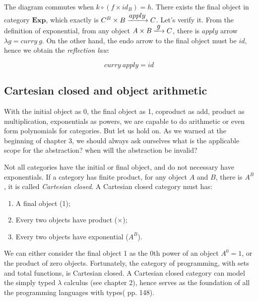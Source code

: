 \documentclass{article}
\begin{document}
The diagram commutes when $k \circ (f \times id_B) = h$. There exists the final object in category $\pmb{Exp}$, which exactly is $C^B \times B \arrowto{apply} C$. Let's verify it. From the definition of exponential, from any object $A \times B \arrowto{g} C$, there is $apply$ arrow $\lambda g = curry\ g$. On the other hand, the endo arrow to the final object must be $id$, hence we obtain the {\em reflection law}:

\[
curry\ apply = id
\]

\begin{Exercise}
\end{Exercise}

\subsection{Cartesian closed and object arithmetic}

With the initial object as 0, the final object as 1, coproduct as add, product as multiplication, exponentials as powers, we are capable to do arithmetic or even form polynomials for categories. But let us hold on. As we warned at the beginning of chapter 3, we should always ask ourselves what is the applicable scope for the abstraction? when will the abstraction be invalid?

Not all categories have the initial or final object, and do not necessary have exponentials. If a category has finite product, for any object $A$ and $B$, there is $A^B$, it is called {\em Cartesian closed}. A Cartesian closed category must has:

\begin{enumerate}
\item A final object (1);
\item Every two objects have product ($\times$);
\item Every two objects have exponential ($A^B$).
\end{enumerate}

We can either consider the final object 1 as the 0th power of an object $A^0 = 1$, or the product of zero objects. Fortunately, the category of programming, with sets and total functions, is Cartesian closed. A Cartesian closed category can model the simply typed $\lambda$ calculus (see chapter 2), hence serves as the foundation of all the programming languages with types(\cite{Milewski2018} pp. 148).
\end{document}
